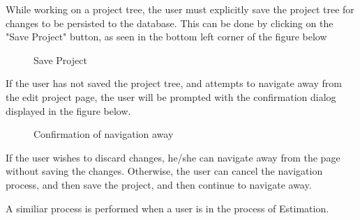 While working on a project tree, the user must explicitly save the project tree for changes to be persisted to the database. This can be done by clicking on the "Save Project" button, as seen in the bottom left corner of the figure below

	\begin{figure}[H]
	    	\centering
	    	\caption{Save Project}
	    	\label{fig: Save Project}
   	\end{figure}

If the user has not saved the project tree, and attempts to navigate away from the edit project page, the user will be prompted with the confirmation dialog displayed in the figure below.

	\begin{figure}[H]
	    	\centering
	    	\caption{Confirmation of navigation away}
	    	\label{fig: Confirmation}
   	\end{figure}

If the user wishes to discard changes, he/she can navigate away from the page without saving the changes. Otherwise, the user can cancel the navigation process, and then save the project, and then continue to navigate away.

A similiar process is performed when a user is in the process of Estimation.